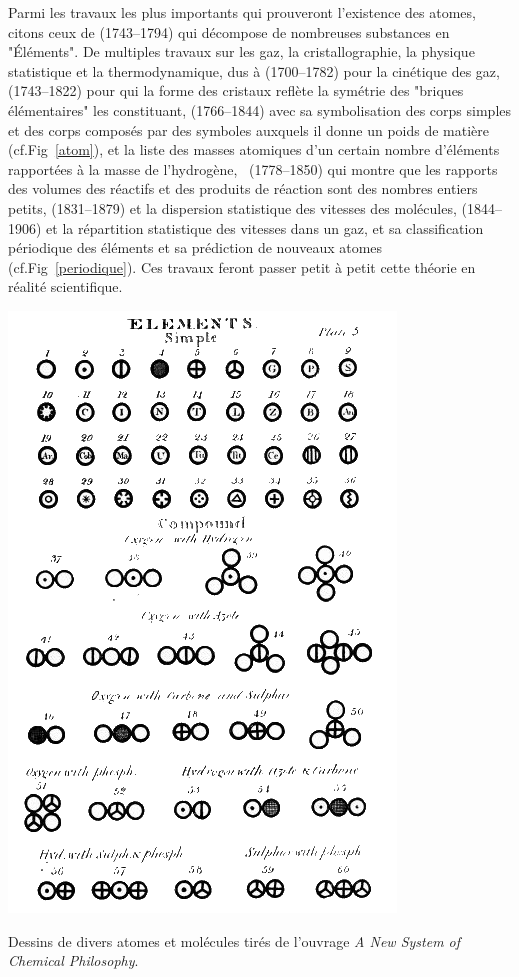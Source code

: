  Parmi les travaux les plus importants qui prouveront l'existence des atomes, citons ceux de  (\num{1743}--\num{1794}) qui décompose de nombreuses substances en "Éléments". De multiples travaux sur les gaz, la cristallographie, la physique statistique et la thermodynamique, dus à  (\num{1700}--\num{1782}) pour la cinétique des gaz,  (\num{1743}--\num{1822}) pour qui la forme des cristaux reflète la symétrie des "briques élémentaires" les constituant,  (\num{1766}--\num{1844}) avec sa symbolisation des corps simples et des corps composés par des symboles auxquels il donne un poids de matière (cf.Fig~\ref{atom}), et la liste des masses atomiques d'un certain nombre d'éléments rapportées à la masse de l'hydrogène, \hbox{ (\num{1778}--\num{1850})} qui montre que les rapports des volumes des réactifs et des produits de réaction sont des nombres entiers petits,  (\num{1831}--\num{1879}) et la dispersion statistique des vitesses des molécules,  (\num{1844}--\num{1906}) et la répartition statistique des vitesses dans un gaz,  et sa classification périodique des éléments et sa prédiction de nouveaux atomes (cf.Fig~\ref{periodique}). Ces travaux feront passer petit à petit cette théorie en réalité scientifique. 
 
\marginpar
{
	\includegraphics[width=\marginparwidth]{SM/Dalton.png}
    \captionsetup{type=figure}\caption{Dessins de divers atomes et molécules tirés de l'ouvrage \textit{A New System of Chemical Philosophy}.}
    \label{atom}
}

